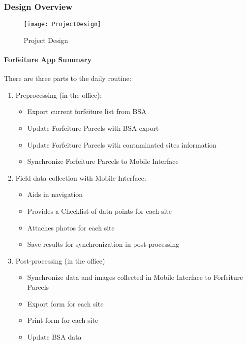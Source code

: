 \subsubsection{Design Overview}
\vspace{-.2in}

\begin{figure}[h!]
\centering
    \texttt{[image: ProjectDesign]}
\vspace{-.2in}

\caption{Project Design}
\end{figure}
\clearpage
\paragraph{Forfeiture App Summary}
\vspace{.25in}

There are three parts to the daily routine:
\vspace{.4in}

\begin{enumerate}
\item \Large Preprocessing \normalsize(in the office):
\begin{itemize}
\item Export current forfeiture list from BSA
\item Update Forfeiture Parcels with BSA export
\item Update Forfeiture Parcels with contaminated sites information
\item Synchronize Forfeiture Parcels to Mobile Interface
\end{itemize}
\item \Large Field data collection \normalsize with Mobile Interface:
\begin{itemize}
\item Aids in navigation
\item Provides a Checklist of data points for each site
\item Attaches photos for each site
\item Save results for synchronization in post-processing
\end{itemize}
\item \Large Post-processing \normalsize (in the office)
\begin{itemize}
\item Synchronize data and images collected in Mobile Interface to Forfeiture Parcels
\item Export form for each site
\item Print form for each site
\item Update BSA data
\end{itemize}
\end{enumerate}
\clearpage
